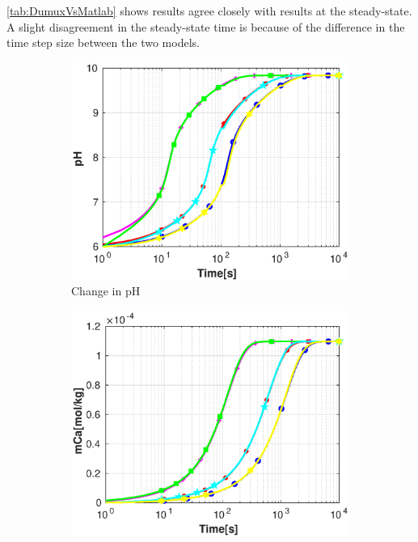 \cref{tab:DumuxVsMatlab} shows \MATLAB results agree closely with \DuMuX results at the steady-state. A slight disagreement in the steady-state time is 
because of the difference in the time step size between the two models. \\

\begin{figure}[!h]
        \centering
    \begin{subfigure}{.5\linewidth}
            \centering
        \includegraphics[width=\textwidth]{PICTURES/dvm_pH6_pH.eps}
        \caption{Change in pH}
        \label{fig:dvmpH6pH}
    \end{subfigure}%
        \hfill
    \begin{subfigure}{.5\linewidth}
            \centering
        \includegraphics[width=\textwidth]{PICTURES/dvm_pH6_mCa.eps}

\end{subfigure}
\end{figure}
